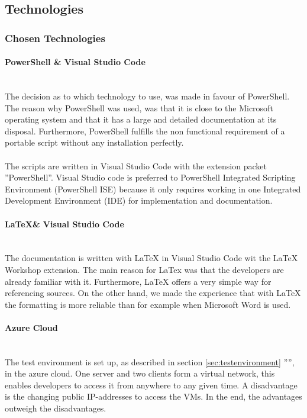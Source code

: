 \clearpage

\subsection{Technologies}
\subsubsection{Chosen Technologies}
\paragraph{PowerShell \& Visual Studio Code} \ \\
The decision as to which technology to use, was made in favour of PowerShell. The reason why PowerShell was used, was that it is close to the Microsoft operating system and that it has a large and detailed documentation at its disposal. Furthermore, PowerShell fulfills the non functional requirement of a portable script without any installation perfectly.\ \\
\ \\
The scripts are written in Visual Studio Code with the extension packet ''PowerShell''. Visual Studio code is preferred to PowerShell Integrated Scripting Environment (PowerShell ISE) because it only requires working in one Integrated Development Environment (IDE) for implementation and documentation.

\paragraph{\LaTeX \& Visual Studio Code}\ \\
The documentation is written with LaTeX in Visual Studio Code wit the LaTeX Workshop extension. The main reason for LaTex was that the developers are already familiar with it. Furthermore, LaTeX offers a very simple way for referencing sources. On the other hand, we made the experience that with LaTeX the formatting is more reliable than for example when Microsoft Word is used.

\paragraph{Azure Cloud}\ \\
The test environment is set up, as described in section \ref{sec:testenvironment} '''', in the azure cloud. One server and two clients form a virtual network, this enables developers to access it from anywhere to any given time. A disadvantage is the changing public IP-addresses to access the VMs. In the end, the advantages outweigh the disadvantages.

